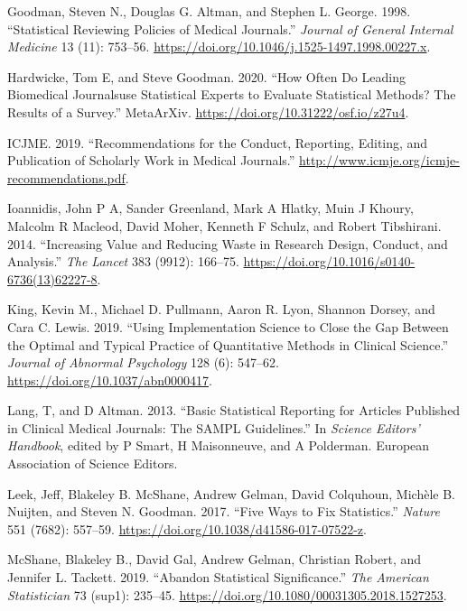 \documentclass[
]{article}
\begin{document}
\leavevmode\hypertarget{ref-Goodman1998}{}%
Goodman, Steven N., Douglas G. Altman, and Stephen L. George. 1998. ``Statistical Reviewing Policies of Medical Journals.'' \emph{Journal of General Internal Medicine} 13 (11): 753--56. \url{https://doi.org/10.1046/j.1525-1497.1998.00227.x}.

\leavevmode\hypertarget{ref-Hardwicke2020}{}%
Hardwicke, Tom E, and Steve Goodman. 2020. ``How Often Do Leading Biomedical Journalsuse Statistical Experts to Evaluate Statistical Methods? The Results of a Survey.'' MetaArXiv. \url{https://doi.org/10.31222/osf.io/z27u4}.

\leavevmode\hypertarget{ref-ICMJE2019}{}%
ICJME. 2019. ``Recommendations for the Conduct, Reporting, Editing, and Publication of Scholarly Work in Medical Journals.'' \url{http://www.icmje.org/icmje-recommendations.pdf}.

\leavevmode\hypertarget{ref-Ioannidis2014}{}%
Ioannidis, John P A, Sander Greenland, Mark A Hlatky, Muin J Khoury, Malcolm R Macleod, David Moher, Kenneth F Schulz, and Robert Tibshirani. 2014. ``Increasing Value and Reducing Waste in Research Design, Conduct, and Analysis.'' \emph{The Lancet} 383 (9912): 166--75. \url{https://doi.org/10.1016/s0140-6736(13)62227-8}.

\leavevmode\hypertarget{ref-King2019}{}%
King, Kevin M., Michael D. Pullmann, Aaron R. Lyon, Shannon Dorsey, and Cara C. Lewis. 2019. ``Using Implementation Science to Close the Gap Between the Optimal and Typical Practice of Quantitative Methods in Clinical Science.'' \emph{Journal of Abnormal Psychology} 128 (6): 547--62. \url{https://doi.org/10.1037/abn0000417}.

\leavevmode\hypertarget{ref-Lang2013}{}%
Lang, T, and D Altman. 2013. ``Basic Statistical Reporting for Articles Published in Clinical Medical Journals: The SAMPL Guidelines.'' In \emph{Science Editors' Handbook}, edited by P Smart, H Maisonneuve, and A Polderman. European Association of Science Editors.

\leavevmode\hypertarget{ref-Leek2017}{}%
Leek, Jeff, Blakeley B. McShane, Andrew Gelman, David Colquhoun, Michèle B. Nuijten, and Steven N. Goodman. 2017. ``Five Ways to Fix Statistics.'' \emph{Nature} 551 (7682): 557--59. \url{https://doi.org/10.1038/d41586-017-07522-z}.

\leavevmode\hypertarget{ref-McShane2019}{}%
McShane, Blakeley B., David Gal, Andrew Gelman, Christian Robert, and Jennifer L. Tackett. 2019. ``Abandon Statistical Significance.'' \emph{The American Statistician} 73 (sup1): 235--45. \url{https://doi.org/10.1080/00031305.2018.1527253}.
\end{document}
